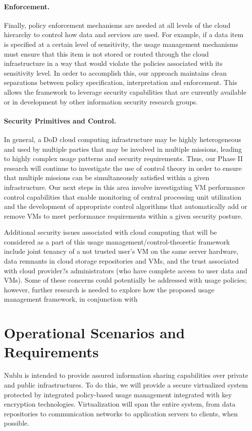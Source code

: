 \documentclass[12pt,letterpaper]{article}
\begin{document}
\paragraph{Enforcement.} Finally, policy enforcement mechanisms are needed at all levels of the cloud hierarchy to control how data and services are used. For example, if a data item is specified at a certain level of sensitivity, the usage management mechanisms must ensure that this item is not stored or routed through the cloud infrastructure in a way that would violate the policies associated with its sensitivity level. In order to accomplish this, our approach maintains clean separations between policy specification, interpretation and enforcement. This allows the framework to leverage security capabilities that are currently available or in development by other information security research groups.

\paragraph{Security Primitives and Control.} In general, a DoD cloud computing infrastructure may be highly heterogeneous and used by multiple parties that may be involved in multiple missions, leading to highly complex usage patterns and security requirements. Thus, our Phase II research will continue to investigate the use of control theory in order to ensure that multiple missions can be simultaneously satisfied within a given infrastructure. Our next steps in this area involve investigating VM performance control capabilities that enable monitoring of central processing unit utilization and the development of appropriate control algorithms that automatically add or remove VMs to meet performance requirements within a given security posture.

Additional security issues associated with cloud computing that will be considered as a part of this usage management/control-theoretic framework include joint tenancy of a not trusted user's VM on the same server hardware, data remnants in cloud storage repositories and VMs, and the trust associated with cloud provider?s administrators (who have complete access to user data and VMs). Some of these concerns could potentially be addressed with usage policies; however, further research is needed to explore how the proposed usage management framework, in conjunction with

\section{Operational Scenarios and Requirements}
\label{section:req-scen}
Nublu is intended to provide assured information sharing capabilities over private and public infrastructures.  To do this, we will provide a secure virtualized system protected by integrated policy-based usage management integrated with key encryption technologies.  Virtualization will span the entire system, from data repositories to communication networks to application servers to clients, when possible.
\end{document}
